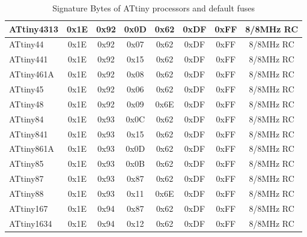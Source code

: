 \begin{table}[H]
\begin{center}
\begin{tabular}{| l | c | c | c || c | c | c | c |}
    \hline
ATtiny4313 & 0x1E & 0x92  & 0x0D & 0x62 & 0xDF & 0xFF & 8/8MHz RC \\
    \hline
ATtiny44   & 0x1E & 0x92  & 0x07 & 0x62 & 0xDF & 0xFF & 8/8MHz RC \\
    \hline
ATtiny441  & 0x1E & 0x92  & 0x15 & 0x62 & 0xDF & 0xFF & 8/8MHz RC \\
    \hline
ATtiny461A & 0x1E & 0x92  & 0x08 & 0x62 & 0xDF & 0xFF & 8/8MHz RC \\
    \hline
ATtiny45   & 0x1E & 0x92  & 0x06 & 0x62 & 0xDF & 0xFF & 8/8MHz RC \\
    \hline
ATtiny48   & 0x1E & 0x92  & 0x09 & 0x6E & 0xDF & 0xFF & 8/8MHz RC \\
    \hline
ATtiny84   & 0x1E & 0x93  & 0x0C & 0x62 & 0xDF & 0xFF & 8/8MHz RC \\
    \hline
ATtiny841  & 0x1E & 0x93  & 0x15 & 0x62 & 0xDF & 0xFF & 8/8MHz RC \\
    \hline
ATtiny861A & 0x1E & 0x93  & 0x0D & 0x62 & 0xDF & 0xFF & 8/8MHz RC \\
    \hline
ATtiny85   & 0x1E & 0x93  & 0x0B & 0x62 & 0xDF & 0xFF & 8/8MHz RC \\
    \hline
ATtiny87   & 0x1E & 0x93  & 0x87 & 0x62 & 0xDF & 0xFF & 8/8MHz RC \\
    \hline
ATtiny88   & 0x1E & 0x93  & 0x11 & 0x6E & 0xDF & 0xFF & 8/8MHz RC \\
    \hline
ATtiny167  & 0x1E & 0x94  & 0x87 & 0x62 & 0xDF & 0xFF & 8/8MHz RC \\
    \hline
ATtiny1634 & 0x1E & 0x94  & 0x12 & 0x62 & 0xDF & 0xFF & 8/8MHz RC \\
    \hline
    \end{tabular}
  \end{center}
  \caption{Signature Bytes of ATtiny processors and default fuses}
  \label{tab:tinySignature}
\end{table}


